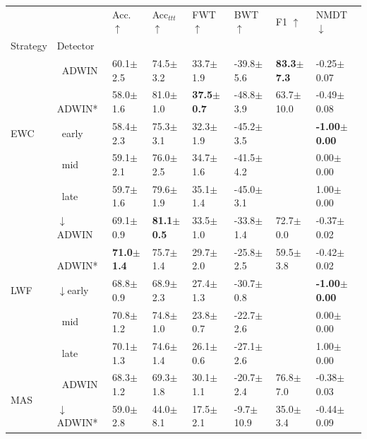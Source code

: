 \begin{tabular}{llllllll}
\toprule
 &  & Acc. $\uparrow$ & Acc$_{ttt}$ $\uparrow$ & FWT $\uparrow$ & BWT $\uparrow$ & F1 $\uparrow$ & NMDT $\downarrow$ \\
Strategy & Detector &  &  &  &  &  &  \\
\midrule
\multirow[t]{5}{*}{EWC} & $\ \;$ADWIN & 60.1\tiny{$\pm$2.5} & 74.5\tiny{$\pm$3.2} & 33.7\tiny{$\pm$1.9} & -39.8\tiny{$\pm$5.6} & \textbf{83.3\tiny{$\pm$7.3}} & -0.25\tiny{$\pm$0.07} \\
 & $\ \;$ADWIN* & 58.0\tiny{$\pm$1.6} & 81.0\tiny{$\pm$1.0} & \textbf{37.5\tiny{$\pm$0.7}} & -48.8\tiny{$\pm$3.9} & 63.7\tiny{$\pm$10.0} & -0.49\tiny{$\pm$0.08} \\
 & $\ \;$early & 58.4\tiny{$\pm$2.3} & 75.3\tiny{$\pm$3.1} & 32.3\tiny{$\pm$1.9} & -45.2\tiny{$\pm$3.5} &  & \textbf{-1.00\tiny{$\pm$0.00}} \\
 & $\ \;$mid & 59.1\tiny{$\pm$2.1} & 76.0\tiny{$\pm$2.5} & 34.7\tiny{$\pm$1.6} & -41.5\tiny{$\pm$4.2} &  & 0.00\tiny{$\pm$0.00} \\
 & $\ \;$late & 59.7\tiny{$\pm$1.6} & 79.6\tiny{$\pm$1.9} & 35.1\tiny{$\pm$1.4} & -45.0\tiny{$\pm$3.1} &  & 1.00\tiny{$\pm$0.00} \\
\midrule
\multirow[t]{5}{*}{LWF} & $\downarrow$ADWIN & 69.1\tiny{$\pm$0.9} & \textbf{81.1\tiny{$\pm$0.5}} & 33.5\tiny{$\pm$1.0} & -33.8\tiny{$\pm$1.4} & 72.7\tiny{$\pm$0.0} & -0.37\tiny{$\pm$0.02} \\
 & $\ \;$ADWIN* & \textbf{71.0\tiny{$\pm$1.4}} & 75.7\tiny{$\pm$1.4} & 29.7\tiny{$\pm$2.0} & -25.8\tiny{$\pm$2.5} & 59.5\tiny{$\pm$3.8} & -0.42\tiny{$\pm$0.02} \\
 & $\downarrow$early & 68.8\tiny{$\pm$0.9} & 68.9\tiny{$\pm$2.3} & 27.4\tiny{$\pm$1.3} & -30.7\tiny{$\pm$0.8} &  & \textbf{-1.00\tiny{$\pm$0.00}} \\
 & $\ \;$mid & 70.8\tiny{$\pm$1.2} & 74.8\tiny{$\pm$1.0} & 23.8\tiny{$\pm$0.7} & -22.7\tiny{$\pm$2.6} &  & 0.00\tiny{$\pm$0.00} \\
 & $\ \;$late & 70.1\tiny{$\pm$1.3} & 74.6\tiny{$\pm$1.4} & 26.1\tiny{$\pm$0.6} & -27.1\tiny{$\pm$2.6} &  & 1.00\tiny{$\pm$0.00} \\
\midrule
\multirow[t]{5}{*}{MAS} & $\ \;$ADWIN & 68.3\tiny{$\pm$1.2} & 69.3\tiny{$\pm$1.8} & 30.1\tiny{$\pm$1.1} & -20.7\tiny{$\pm$2.4} & 76.8\tiny{$\pm$7.0} & -0.38\tiny{$\pm$0.03} \\
 & $\downarrow$ADWIN* & 59.0\tiny{$\pm$2.8} & 44.0\tiny{$\pm$8.1} & 17.5\tiny{$\pm$2.1} & -9.7\tiny{$\pm$10.9} & 35.0\tiny{$\pm$3.4} & -0.44\tiny{$\pm$0.09} \\

\end{tabular}
